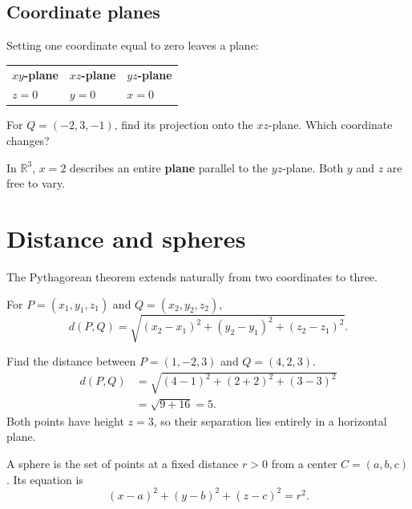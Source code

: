 \documentclass[11pt]{article}
\begin{document}
\subsection*{Coordinate planes}
Setting one coordinate equal to zero leaves a plane:
\begin{center}
\begin{tabularx}{0.88\linewidth}{@{}XXX@{}}
\toprule
\textbf{$xy$-plane} & \textbf{$xz$-plane} & \textbf{$yz$-plane}\\
$z=0$ & $y=0$ & $x=0$\\
\bottomrule
\end{tabularx}
\end{center}

\begin{checkpoint}
For $Q=(-2,3,-1)$, find its projection onto the $xz$-plane.
Which coordinate changes?
\end{checkpoint}

\begin{commonmistake}
In $\mathbb{R}^3$, $x=2$ describes an entire \textbf{plane} parallel to the
$yz$-plane. Both $y$ and $z$ are free to vary.
\end{commonmistake}


\section{Distance and spheres}
The Pythagorean theorem extends naturally from two coordinates to three.

\begin{keyidea}
For $P=(x_1,y_1,z_1)$ and $Q=(x_2,y_2,z_2)$,
\[
  d(P,Q)=\sqrt{(x_2-x_1)^2+(y_2-y_1)^2+(z_2-z_1)^2}.
\]
\end{keyidea}

\begin{example}{Find the distance between $P=(1,-2,3)$ and $Q=(4,2,3)$.}
\begin{align*}
  d(P,Q)&=\sqrt{(4-1)^2+(2+2)^2+(3-3)^2}\\
        &=\sqrt{9+16}=5.
\end{align*}
Both points have height $z=3$, so their separation lies entirely in a
horizontal plane.
\end{example}

\begin{definition}[Sphere]
A sphere is the set of points at a fixed distance $r>0$ from a center
$C=(a,b,c)$. Its equation is
\[
  (x-a)^2+(y-b)^2+(z-c)^2=r^2.
\]
\end{definition}
\end{document}

